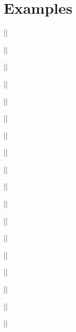 \documentclass[11pt]{article}
\begin{document}
\section{Examples}
\begin{multicols}{3}
||


||


||

\end{multicols}
\clearpage
\begin{multicols}{3}
||


||


||


\end{multicols}
\begin{multicols}{3}
||


||


||

\end{multicols}
\begin{multicols}{3}
||


||


||

\end{multicols}
\clearpage
\begin{multicols}{3}
||


||


||

\end{multicols}
\begin{multicols}{3}
||


||


||

\end{multicols}
\end{document}
